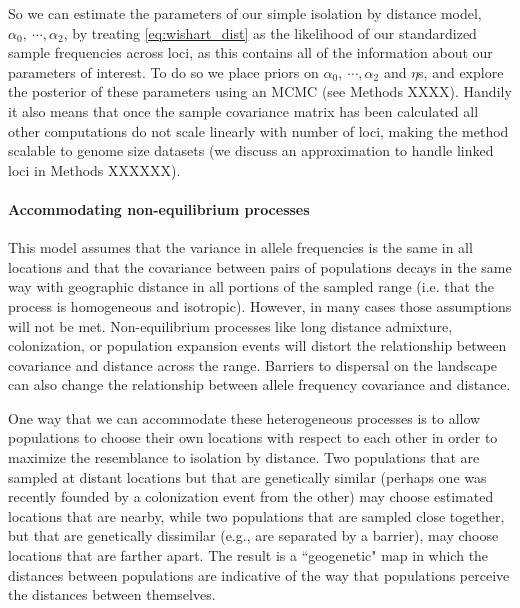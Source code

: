 \documentclass[12pt]{article}
\newcommand{\gc}[1]{{\em \color{blue} #1}}
\begin{document}

So we can estimate the parameters of our simple isolation by distance model, $\alpha_0,~\cdots, \alpha_2$, by treating \ref{eq:wishart_dist} as the likelihood of our standardized sample frequencies across loci, as this contains all of the information about our parameters of interest. To do so we place priors on $\alpha_0,~\cdots, \alpha_2$ and $\eta$s, and explore the posterior of these parameters using an MCMC (see Methods XXXX). Handily it also means that once the sample covariance matrix has been calculated all other computations do not scale linearly with number of loci, making the method scalable to genome size datasets (we discuss an approximation to handle linked loci in Methods XXXXXX). 


\paragraph{Accommodating non-equilibrium processes}

This model assumes that the variance in allele frequencies is the same in all locations and that the covariance between pairs of populations decays in the same way with geographic distance in all portions of the sampled range (i.e. that the process is homogeneous and isotropic). However, in many cases those assumptions will not be met. Non-equilibrium processes like long distance admixture, colonization, or population expansion events will distort the relationship between covariance and distance across the range.  Barriers to dispersal on the landscape can also change the relationship between allele frequency covariance and distance.

One way that we can accommodate these heterogeneous processes is to allow populations to choose their own locations with respect to each other in order to maximize the resemblance to isolation by distance. Two populations that are sampled at distant locations but that are genetically similar (perhaps one was recently founded by a colonization event from the other) may choose estimated locations that are nearby, while two populations that are sampled close together, but that are genetically dissimilar (e.g., are separated by a barrier), may choose locations that are farther apart. The result is a ``geogenetic" map in which the distances between populations are indicative of the way that populations perceive the distances between themselves.  
\end{document}
